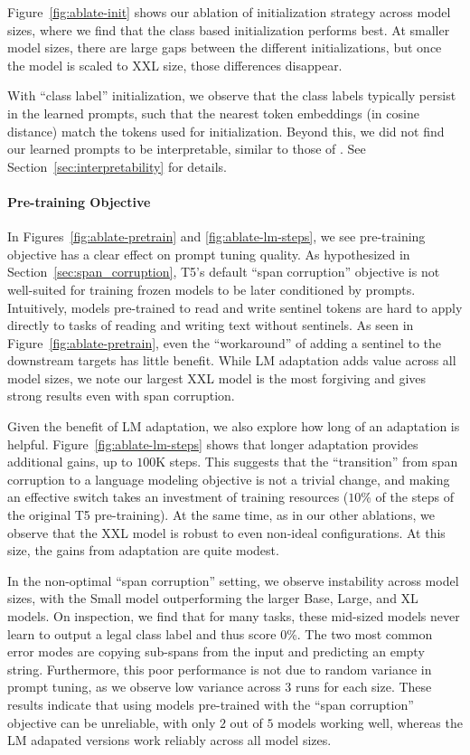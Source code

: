 \documentclass[11pt]{article}
\begin{document}
Figure~\ref{fig:ablate-init} shows our ablation of initialization strategy across model sizes, where we find that the class based initialization performs best. At smaller model sizes, there are large gaps between the different initializations, but once the model is scaled to XXL size, those differences disappear.

With ``class label'' initialization, we observe that the class labels typically persist in the learned prompts, such that the nearest token embeddings (in cosine distance) match the tokens used for initialization. Beyond this, we did not find our learned prompts to be interpretable, similar to those of \citet{shin-etal-2020-autoprompt}. See Section~\ref{sec:interpretability} for details.

\paragraph{Pre-training Objective} In Figures~\ref{fig:ablate-pretrain} and \ref{fig:ablate-lm-steps}, we see pre-training objective has a clear effect on prompt tuning quality. As hypothesized in Section~\ref{sec:span_corruption}, T5's default ``span corruption'' objective is not well-suited for training frozen models to be later conditioned by prompts. Intuitively, models pre-trained to read and write sentinel tokens are hard to apply directly to tasks of reading and writing text without sentinels. As seen in Figure~\ref{fig:ablate-pretrain}, even the ``workaround'' of adding a sentinel to the downstream targets has little benefit. While LM adaptation adds value across all model sizes, we note our largest XXL model is the most forgiving and gives strong results even with span corruption.

Given the benefit of LM adaptation, we also explore how long of an adaptation is helpful. Figure~\ref{fig:ablate-lm-steps} shows that longer adaptation provides additional gains, up to $100$K steps. This suggests that the ``transition'' from span corruption to a language modeling objective is not a trivial change, and making an effective switch takes an investment of training resources ($10$\% of the steps of the original T5 pre-training). At the same time, as in our other ablations, we observe that the XXL model is robust to even non-ideal configurations. At this size, the gains from adaptation are quite modest.

In the non-optimal ``span corruption'' setting, we observe instability across model sizes, with the Small model outperforming the larger Base, Large, and XL models. On inspection, we find that for many tasks, these mid-sized models never learn to output a legal class label and thus score 0\%. The two most common error modes are copying sub-spans from the input and predicting an empty string. Furthermore, this poor performance is not due to random variance in prompt tuning, as we observe low variance across $3$ runs for each size. These results indicate that using models pre-trained with the ``span corruption'' objective can be unreliable, with only $2$ out of $5$ models working well, whereas the LM adapated versions work reliably across all model sizes.
\end{document}
